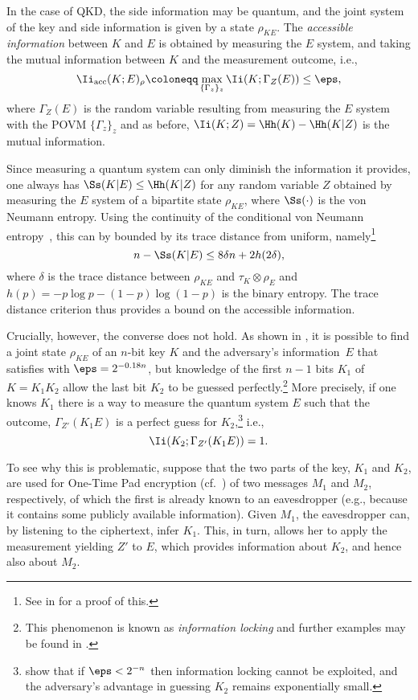 In the case of QKD, the side information may be quantum, and the
joint system of the key and side information is given by a state
$\rho_{KE}$. The \emph{accessible information} between $K$ and $E$ is
obtained by measuring the $E$ system, and taking the mutual
information between $K$ and the measurement outcome, i.e., 
\begin{equation} \label{eq:localqkd} \Ii_{\text{acc}} (K;E)_\rho
  \coloneqq \max_{\{\Gamma_z\}_z} \Ii(K;\Gamma_Z(E)) \leq \eps,
 \end{equation} 
 where $\Gamma_Z(E)$ is the random variable resulting from measuring
 the $E$ system with the POVM $\{\Gamma_z\}_z$ and as before,
 $\Ii(K;Z) = \Hh(K) - \Hh(K|Z)$ is the mutual information.

 Since measuring a quantum system can only diminish the information it
 provides, one always has $\Ss(K|E) \leq \Hh(K|Z)$ for any random
 variable $Z$ obtained by measuring the $E$ system of a bipartite
 state $\rho_{KE}$, where $\Ss(\cdot)$ is the von Neumann
 entropy. Using the continuity of the conditional von Neumann
 entropy~\cite{AF04}, this can by bounded by its trace distance from
 uniform, namely\footnote{See  in
    for a proof of this.}
 \[
 n - \Ss(K|E) \leq 8 \delta n + 2h(2\delta),
 \] 
 where $\delta$ is the trace distance between $\rho_{KE}$ and
 $\tau_K \otimes \rho_E$ and $h(p) = - p \log p - (1-p) \log (1-p)$ is
 the binary entropy. The trace distance criterion thus provides a
 bound on the accessible information.

 Crucially, however, the converse does not hold. As shown in
 \textcite{KRBM07}, it is possible to find a joint state $\rho_{K E}$
 of an $n$-bit key $K$ and the adversary's information~$E$ that
 satisfies  with $\eps = 2^{-0.18n}$, but knowledge
 of the first $n-1$ bits $K_1$ of $K=K_1K_2$ allow the last bit $K_2$
 to be guessed perfectly.\footnote{This phenomenon is known as
   \emph{information locking} and further examples may be found in
   \textcite{DHLST04,Win17}.} More precisely, if one knows $K_1$ there
 is a way to measure the quantum system $E$ such that the outcome,
 $\Gamma_{Z'}(K_1E)$ is a perfect guess for
 $K_2$,\footnote{\textcite{BHLMO05} show that if $\eps < 2^{-n}$ then
   information locking cannot be exploited, and the adversary's
   advantage in guessing $K_2$ remains exponentially small.} i.e.,
 \[\Ii(K_2;\Gamma_{Z'}(K_1E)) = 1.\]

 To see why this is problematic, suppose that the two parts of the
 key, $K_1$ and $K_2$, are used for One-Time Pad encryption (cf.\
 ) of two messages $M_1$ and $M_2$, respectively,
 of which the first is already known to an eavesdropper (e.g., because
 it contains some publicly available information).  Given $M_1$, the
 eavesdropper can, by listening to the ciphertext, infer $K_1$. This,
 in turn, allows her to apply the measurement yielding $Z'$ to $E$,
 which provides information about $K_2$, and hence also about $M_2$.

